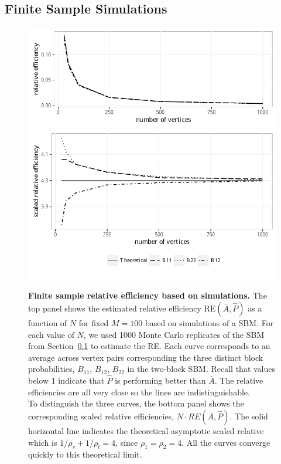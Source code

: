 \documentclass[10pt,letterpaper]{article}
\begin{document}
\subsection{Finite Sample Simulations}\label{sec:sbm_sim}


\begin{figure}[!htb]
    \centering
    \includegraphics[width=1\textwidth]{RE.pdf}
    \includegraphics[width=1\textwidth]{scaled_RE.pdf}
    \caption{{\bf Finite sample relative efficiency based on simulations. }
    The top panel shows the estimated relative efficiency $\mathrm{RE}(\bar{A},\hat{P})$ as a function of $N$ for fixed $M=100$ based on simulations of a SBM. 
    For each value of $N$, we used 1000 Monte Carlo replicates of the SBM from Section~\ref{sec:sbm_sim} to estimate the RE.
    Each curve corresponds to an average across vertex pairs corresponding the three distinct block probabilities, $B_{11}$, $B_{12}$, $B_{22}$ in the two-block SBM.
    Recall that values below 1 indicate that $\hat{P}$ is performing better than $\bar{A}$.
    The relative efficiencies are all very close so the lines are indistinguishable. \\
    To distinguish the three curves, the bottom panel shows the corresponding scaled relative efficiencies, $N\cdot RE(\bar{A},\hat{P})$.
    The solid horizontal line indicates the theoretical asymptotic scaled relative which is  $1/\rho_s+1/\rho_t=4$, since $\rho_1=\rho_2=4$.
    All the curves converge quickly to this theoretical limit. }
    \label{fig:RE}
\end{figure}
\end{document}
